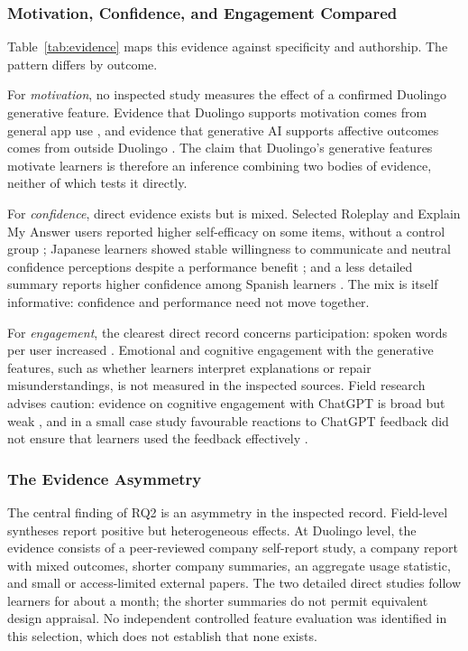\documentclass[11pt,titlepage]{article}
\begin{document}
\subsubsection{Motivation, Confidence, and Engagement Compared}
Table~\ref{tab:evidence} maps this evidence against specificity and authorship. The pattern differs by outcome.

For \emph{motivation}, no inspected study measures the effect of a confirmed Duolingo generative feature. Evidence that Duolingo supports motivation comes from general app use \parencite{zeng2024}, and evidence that generative AI supports affective outcomes comes from outside Duolingo \parencite{saarela2026}. The claim that Duolingo's generative features motivate learners is therefore an inference combining two bodies of evidence, neither of which tests it directly.

For \emph{confidence}, direct evidence exists but is mixed. Selected Roleplay and Explain My Answer users reported higher self-efficacy on some items, without a control group \parencite{kittredge2025self}; Japanese learners showed stable willingness to communicate and neutral confidence perceptions despite a performance benefit \parencite{kittredge2025video}; and a less detailed summary reports higher confidence among Spanish learners \parencite{videoResearch}. The mix is itself informative: confidence and performance need not move together.

For \emph{engagement}, the clearest direct record concerns participation: spoken words per user increased \parencite{shareholderQ12026}. Emotional and cognitive engagement with the generative features, such as whether learners interpret explanations or repair misunderstandings, is not measured in the inspected sources. Field research advises caution: evidence on cognitive engagement with ChatGPT is broad but weak \parencite{loEngagement2024}, and in a small case study favourable reactions to ChatGPT feedback did not ensure that learners used the feedback effectively \parencite{yan2024}.

\subsubsection{The Evidence Asymmetry}
The central finding of RQ2 is an asymmetry in the inspected record. Field-level syntheses report positive but heterogeneous effects. At Duolingo level, the evidence consists of a peer-reviewed company self-report study, a company report with mixed outcomes, shorter company summaries, an aggregate usage statistic, and small or access-limited external papers. The two detailed direct studies follow learners for about a month; the shorter summaries do not permit equivalent design appraisal. No independent controlled feature evaluation was identified in this selection, which does not establish that none exists.
\end{document}
